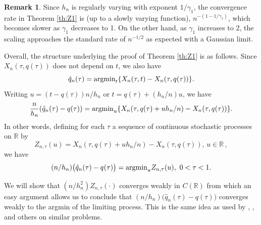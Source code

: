 \documentclass[12pt]{amsart}
\newcommand{\R}{\mathbb{R}}
\newcommand{\1}{\mathbbm{1}}
\newcommand{\0}{\mathbf{0}}
\theoremstyle{plain}
\theoremstyle{definition}
\newtheorem{remark}[theorem]{Remark}
\begin{document}
\begin{remark} \label{rk:structure}
 Since $h_n$ is regularly varying with exponent $1/\gamma_1$, the convergence rate in Theorem \ref{th:Z1} is (up to a slowly varying function), $n^{-(1-1/\gamma_1)}$, which becomes slower as $\gamma_1$ decreases to 1. On the other hand, as $\gamma_1$ increases to 2, the scaling approaches the standard rate of $n^{-1/2}$ as expected with a Gaussian limit.

Overall, 
the structure underlying the proof of Theorem \ref{th:Z1} is as follows. 
Since $X_n(\tau,q(\tau))$ does not depend on $t$, we also have 
\begin{equation*} \label{e:main.split}
  \hat q_n(\tau) = {\rm argmin}_t \{X_n(\tau,t) - X_n(\tau,q(\tau))\}.  
\end{equation*}
Writing $u=(t-q(\tau))n/h_n$ or $t=q(\tau) +(h_n/n)u$, we have  
\begin{equation}
    \frac{n}{h_n}(\hat q_n(\tau)-q(\tau))={\rm argmin}_u \{X_n (\tau, q(\tau)+uh_n/n)- X_n(\tau,q(\tau))\}.  
\end{equation}
In other words, defining for each $\tau$ a sequence of continuous stochastic processes on $\R$ by
\begin{equation*}\label{eqn:zprocess}
 Z_{n,\tau}(u)= X_n (\tau, q(\tau)+uh_n/n)- X_n(\tau,q(\tau)), \, u\in\R \,, 
\end{equation*}
we have
\begin{equation} \label{e:exr.diff}
(n/h_n)\bigl( \hat q_n(\tau) -q(\tau)\bigr) = {\rm argmin}_{u}
Z_{n,\tau}(u), \ 0<\tau<1.
\end{equation}

 We will show that $ (n/h_n^2)Z_{n,\tau}(\cdot)$ converges weakly in $C(\R)$ from which an easy argument allows us to conclude that $(n/h_n)\bigl( \hat q_n(\tau)-q(\tau)\bigr)$ converges weakly to the argmin of the limiting process.  This is the same idea as used by \cite{davis1992m}, \cite{knight2002limiting}, \cite{goh2009nonstandard} and others on similar problems.   


\end{remark}
\end{document}
